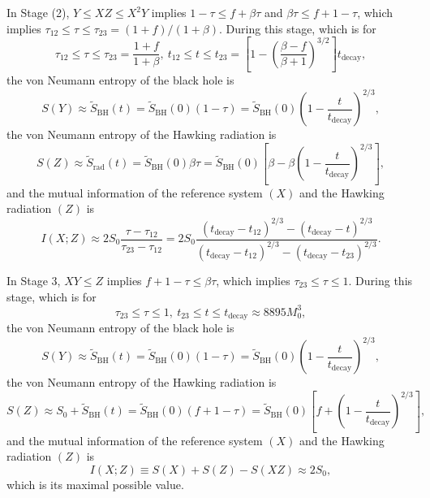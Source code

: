 \documentclass[12pt]{article}
\begin{document}
In Stage (2), $Y \leq XZ \leq X^2Y$ implies $1-\tau \leq f+\beta\tau$ and $\beta\tau \leq f+1-\tau$, which implies $\tau_{12} \leq \tau \leq \tau_{23} = (1+f)/(1+\beta)$.  During this stage, which is for
\begin{equation}
\tau_{12} \leq \tau \leq \tau_{23} = \frac{1+f}{1+\beta},\ t_{12} \leq t \leq t_{23}
  = \left[1-\left(\frac{\beta-f}{\beta+1}\right)^{3/2}\right]t_\mathrm{decay},
\label{tau2}
\end{equation}
the von Neumann entropy of the black hole is
\begin{equation}
S(Y) \approx \tilde{S}_\mathrm{BH}(t) = \tilde{S}_\mathrm{BH}(0)(1-\tau)
     = \tilde{S}_\mathrm{BH}(0)\left(1-\frac{t}{t_\mathrm{decay}}\right)^{2/3},
\label{S2Y}
\end{equation}
the von Neumann entropy of the Hawking radiation is
\begin{equation}
S(Z) \approx \tilde{S}_\mathrm{rad}(t) = \tilde{S}_\mathrm{BH}(0)\beta\tau
     = \tilde{S}_\mathrm{BH}(0)\left[\beta-\beta\left(1-\frac{t}{t_\mathrm{decay}}\right)^{2/3}\right],
\label{S2Z}
\end{equation}  
and the mutual information of the reference system $(X)$ and the Hawking radiation $(Z)$ is
\begin{equation}
I(X;Z) \approx 2S_0\frac{\tau-\tau_{12}}{\tau_{23}-\tau_{12}}
= 2S_0\frac{(t_\mathrm{decay}-t_{12})^{2/3}-(t_\mathrm{decay}-t)^{2/3}}
           {(t_\mathrm{decay}-t_{12})^{2/3}-(t_\mathrm{decay}-t_{23})^{2/3}}.
\label{mutual2}
\end{equation}

In Stage 3, $XY \leq Z$ implies $f+1-\tau \leq \beta\tau$, which implies $\tau_{23} \leq \tau \leq 1$.  During this stage, which is for
\begin{equation}
\tau_{23} \leq \tau \leq 1,\ t_{23} \leq t \leq t_\mathrm{decay} \approx 8895 M_0^3,
\label{tau3}
\end{equation}
the von Neumann entropy of the black hole is
\begin{equation}
S(Y) \approx \tilde{S}_\mathrm{BH}(t) = \tilde{S}_\mathrm{BH}(0)(1-\tau)
     = \tilde{S}_\mathrm{BH}(0)\left(1-\frac{t}{t_\mathrm{decay}}\right)^{2/3},
\label{S3Y}
\end{equation}
the von Neumann entropy of the Hawking radiation is
\begin{equation}
S(Z) \!\approx\! S_0 + \tilde{S}_\mathrm{BH}(t) \!=\! \tilde{S}_\mathrm{BH}(0)(f+1-\tau)
     \!=\! \tilde{S}_\mathrm{BH}(0)
     \left[f+\left(1-\frac{t}{t_\mathrm{decay}}\right)^{2/3}\right],
\label{S3Z}
\end{equation}  
and the mutual information of the reference system $(X)$ and the Hawking radiation $(Z)$ is
\begin{equation}
I(X;Z) \equiv S(X)+S(Z)-S(XZ) \approx 2S_0,
\label{mutual3}
\end{equation}
which is its maximal possible value.
\end{document}
